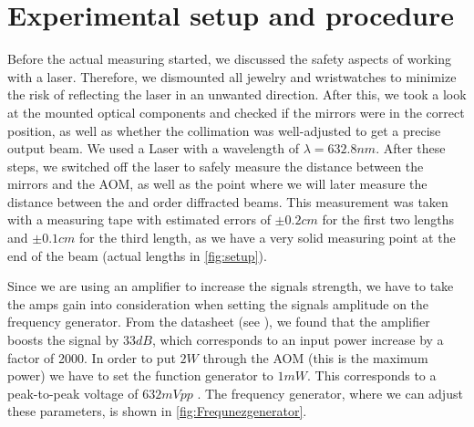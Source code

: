 \section{Experimental setup and procedure}
Before the actual measuring started, we discussed the safety aspects of working with a laser. Therefore, we dismounted all jewelry and wristwatches to minimize the risk of reflecting the laser in an unwanted direction. After this, we took a look at the mounted optical components and checked if the mirrors were in the correct position, as well as whether the collimation was well-adjusted to get a precise output beam. We used a  Laser with a wavelength of $\lambda = 632.8 \unit{nm}$. After these steps, we switched off the laser to safely measure the distance between the mirrors and the AOM, as well as the point where we will later measure the distance between the  and  order diffracted beams. This measurement was taken with a measuring tape with estimated errors of $ \pm 0.2 \unit{cm} $ for the first two lengths and $ \pm 0.1 \unit{cm} $ for the third length, as we have a very solid measuring point at the end of the beam (actual lengths in \autoref{fig:setup}).

Since we are using an amplifier to increase the signals strength, we have to take the amps gain into consideration when setting the signals amplitude on the frequency generator. From the datasheet (see \autocite{DatenBlattAmplifier}), we found that the amplifier boosts the signal by $33 \unit{dB}$, which corresponds to an input power increase by a factor of 2000. In order to put $2 \unit{W}$ through the AOM (this is the maximum power) we have to set the function generator to $1 \unit{mW}$. This corresponds to a peak-to-peak voltage of $632 \unit{mVpp}$ \autocite{UmrechnungsTabelleDB}. The frequency generator, where we can adjust these parameters, is shown in \autoref{fig:Frequnezgenerator}. 

